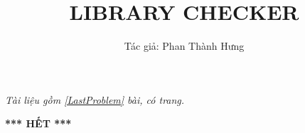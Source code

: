 \documentclass[11pt,a4paper]{article}
\title{LIBRARY CHECKER}
\author{Tác giả: Phan Thành Hưng}
\begin{document}
\maketitle

\vfill
\begin{center}
    \small
    \textit{Tài liệu gồm \ref{LastProblem} bài, có \pageref{LastPage} trang.}
\end{center}
\vspace{5em}


\newpage


\newpage


\newpage


\newpage


\newpage


\newpage


\newpage


\newpage


\newpage


\newpage


\newpage


\newpage


\newpage


% 


\label{LastProblem}
\label{LastPage}

\vfill
\begin{center}
    \textbf{*** HẾT ***}
\end{center}
\vspace{3em}
\end{document}

